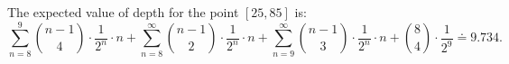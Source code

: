 

The expected value of depth for the point $[25,85]$ is:
$$\sum_{n=8}^{9}\binom{n-1}{4}\cdot \frac{1}{2^n}\cdot n + \sum_{n=8}^{\infty}\binom{n-1}{2}\cdot \frac{1}{2^n}\cdot n + \sum_{n=9}^{\infty}\binom{n-1}{3}\cdot \frac{1}{2^n}\cdot n + \binom{8}{4}\cdot \frac{1}{2^9} \doteq 9.734.$$




